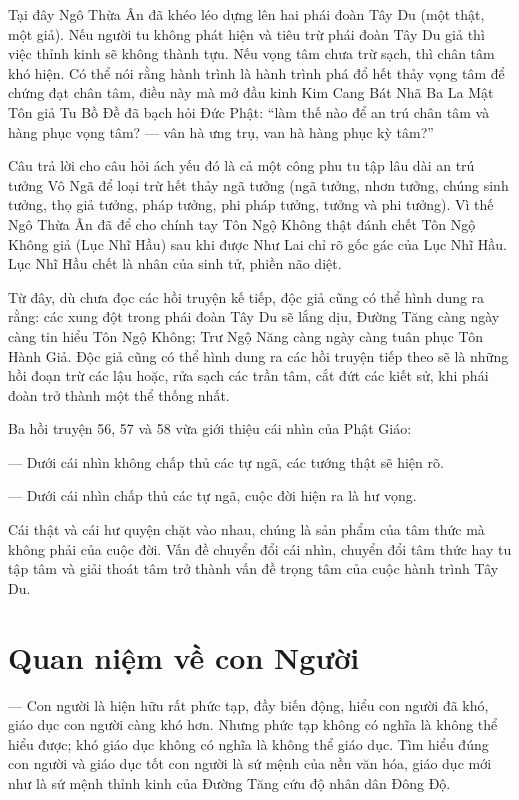 Tại đây Ngô Thừa Ân đã khéo léo dựng lên hai phái đoàn Tây Du (một thật, một giả). Nếu người tu không phát hiện và tiêu trừ phái đoàn Tây Du giả thì việc thỉnh kinh sẽ không thành tựu. Nếu vọng tâm chưa trừ sạch, thì chân tâm khó hiện. Có thể nói rằng hành trình là hành trình phá đổ hết thảy vọng tâm để chứng đạt chân tâm, điều này mà mở đầu kinh Kim Cang Bát Nhã Ba La Mật Tôn giả Tu Bồ Đề đã bạch hỏi Đức Phật: ``làm thế nào để an trú chân tâm và hàng phục vọng tâm? — vân hà ưng trụ, van hà hàng phục kỳ tâm?''

Câu trả lời cho câu hỏi ách yếu đó là cả một công phu tu tập lâu dài an trú tưởng Vô Ngã để loại trừ hết thảy ngã tưởng (ngã tưởng, nhơn tưởng, chúng sinh tưởng, thọ giả tưởng, pháp tưởng, phi pháp tưởng, tưởng và phi tưởng). Vì thế Ngô Thừa Ân đã để cho chính tay Tôn Ngộ Không thật đánh chết Tôn Ngộ Không giả (Lục Nhĩ Hầu) sau khi được Như Lai chỉ rõ gốc gác của Lục Nhĩ Hầu. Lục Nhĩ Hầu chết là nhân của sinh tử, phiền não diệt.

Từ đây, dù chưa đọc các hồi truyện kế tiếp, độc giả cũng có thể hình dung ra rằng: các xung đột trong phái đoàn Tây Du sẽ lắng dịu, Đường Tăng càng ngày càng tin hiểu Tôn Ngộ Không; Trư Ngộ Năng càng ngày càng tuân phục Tôn Hành Giả. Độc giả cũng có thể hình dung ra các hồi truyện tiếp theo sẽ là những hồi đoạn trừ các lậu hoặc, rửa sạch các trần tâm, cắt đứt các kiết sử, khi phái đoàn trở thành một thể thống nhất.

Ba hồi truyện 56, 57 và 58 vừa giới thiệu cái nhìn của Phật Giáo:

— Dưới cái nhìn không chấp thủ các tự ngã, các tướng thật sẽ hiện rõ.

— Dưới cái nhìn chấp thủ các tự ngã, cuộc đời hiện ra là hư vọng.

Cái thật và cái hư quyện chặt vào nhau, chúng là sản phẩm của tâm thức mà không phải của cuộc đời. Vấn đề chuyển đổi cái nhìn, chuyển đổi tâm thức hay tu tập tâm và giải thoát tâm trở thành vấn đề trọng tâm của cuộc hành trình Tây Du.

\section{Quan niệm về con Người} %
\label{sec:56_57_con_nguoi}

— Con người là hiện hữu rất phức tạp, đầy biến động, hiểu con người đã khó, giáo dục con người càng khó hơn. Nhưng phức tạp không có nghĩa là không thể hiểu được; khó giáo dục không có nghĩa là không thể giáo dục. Tìm hiểu đúng con người và giáo dục tốt con người là sứ mệnh của nền văn hóa, giáo dục mới như là sứ mệnh thỉnh kinh của Đường Tăng cứu độ nhân dân Đông Độ.

